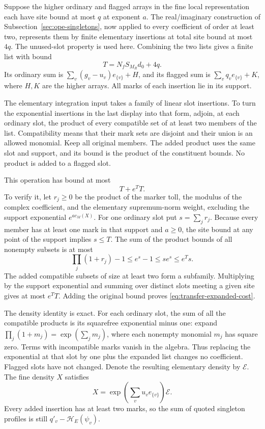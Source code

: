 Suppose the higher ordinary and flagged arrays in the fine local
representation each have site bound at most $q$ at exponent $a$.
The real/imaginary construction of Subsection~\ref{sec:ope-singletons},
now applied to every coefficient of order at least two, represents
them by finite elementary insertions at total site bound at most
$4q$. The unused-slot property is used here. Combining the two
lists gives a finite list with bound
\begin{equation}\label{eq:transfer-inventory-cost}
                       T=N_fS_{M_R}d_0+4q.
\end{equation}
Its ordinary sum is $\sum_v(g_v-u_v)e_{\{v\}}+H$,
and its flagged sum is $\sum_vq_ve_{\{v\}}+K$, where $H,K$
are the higher arrays. All marks of each insertion lie in its support.

The elementary integration input takes a family of linear slot
insertions. To turn the exponential insertions in the last display
into that form, adjoin, at each ordinary slot, the product of every
compatible set of at least two members of the list. Compatibility
means that their mark sets are disjoint and their union is an
allowed monomial. Keep all original members. The added product
uses the same slot and support, and its bound is the product of
the constituent bounds. No product is added to a flagged slot.

This operation has bound at most
\begin{equation}\label{eq:transfer-expanded-cost}
                              T+e^TT.
\end{equation}
To verify it, let $r_j\ge0$ be the product of the marker toll,
the modulus of the complex coefficient, and the elementary
supremum-norm weight, excluding the support exponential
$e^{a c_M(X)}$. For one ordinary slot put $s=\sum_jr_j$. Because every member has at least one
mark in that support and $a\ge0$, the site bound at any point of
the support implies $s\le T$. The sum of the product bounds of
all nonempty subsets is at most
\[
       \prod_j(1+r_j)-1\le e^s-1\le se^s\le e^Ts.
\]
The added compatible subsets of size at least two form a subfamily.
Multiplying by the support exponential and summing over distinct
slots meeting a given site gives at most $e^TT$. Adding the
original bound proves \eqref{eq:transfer-expanded-cost}.

The density identity is exact. For each ordinary slot, the sum
of all the compatible products is its squarefree exponential
minus one: expand $\prod_j(1+m_j)=\exp(\sum_jm_j)$, where each
nonempty monomial $m_j$ has square zero. Terms with incompatible
marks vanish in the algebra. Thus replacing the exponential at
that slot by one plus the expanded list changes no coefficient.
Flagged slots have not changed. Denote the resulting elementary
density by $\mathcal E$. The fine density $X$ satisfies
\begin{equation}\label{eq:transfer-elementary-identity}
             X=\exp\left(\sum_vu_ve_{\{v\}}\right)\mathcal E.
\end{equation}
Every added insertion has at least two marks, so the sum of quoted
singleton profiles is still $q'_v-\mathcal H_E(\psi_v)$.

